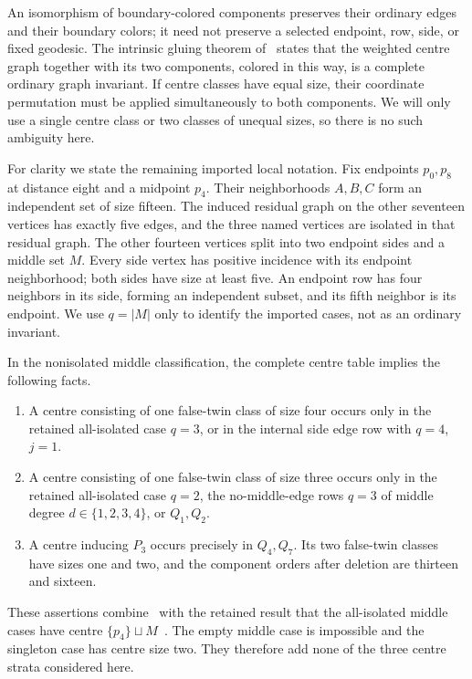 \documentclass[11pt]{article}
\newcommand{\sq}{\sqcup}
\begin{document}
An isomorphism of boundary-colored components preserves their ordinary
edges and their boundary colors; it need not preserve a selected endpoint,
row, side, or fixed geodesic. The intrinsic gluing theorem of~\cite{centre}
states that the weighted centre graph together with its two components,
colored in this way, is a complete ordinary graph invariant. If centre
classes have equal size, their coordinate permutation must be applied
simultaneously to both components. We will only use a single centre
class or two classes of unequal sizes, so there is no such ambiguity here.

For clarity we state the remaining imported local notation. Fix endpoints
$p_0,p_8$ at distance eight and a midpoint $p_4$. Their neighborhoods
$A,B,C$ form an independent set of size fifteen. The induced residual
graph on the other seventeen vertices has exactly five edges, and the
three named vertices are isolated in that residual graph. The other
fourteen vertices split into two endpoint sides and a middle set $M$.
Every side vertex has positive incidence with its endpoint neighborhood;
both sides have size at least five. An endpoint row has four neighbors
in its side, forming an independent subset, and its fifth neighbor is
its endpoint. We use $q=|M|$ only to identify the imported cases, not as
an ordinary invariant.

In the nonisolated middle classification, the complete centre table
implies the following facts.
\begin{enumerate}
\item A centre consisting of one false-twin class of size four occurs
only in the retained all-isolated case $q=3$, or in the internal side
edge row with $q=4$, $j=1$.
\item A centre consisting of one false-twin class of size three occurs
only in the retained all-isolated case $q=2$, the no-middle-edge rows
$q=3$ of middle degree $d\in\{1,2,3,4\}$, or $Q_1,Q_2$.
\item A centre inducing $P_3$ occurs precisely in $Q_4,Q_7$. Its two
false-twin classes have sizes one and two, and the component orders
after deletion are thirteen and sixteen.
\end{enumerate}
These assertions combine~\cite{rows,centre} with the retained result
that the all-isolated middle cases have centre
$\{p_4\}\sq M$~\cite{middle}. The empty middle case is impossible and
the singleton case has centre size two. They therefore add none of the
three centre strata considered here.
\end{document}
